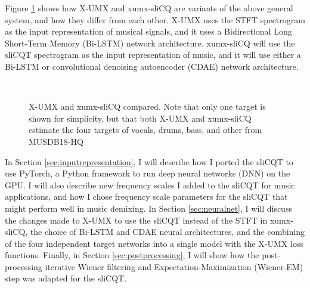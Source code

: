 \documentclass[report.tex]{subfiles}
\begin{document}
Figure \ref{fig:umxandxumxslicq} shows how X-UMX and xumx-sliCQ are variants of the above general system, and how they differ from each other. X-UMX uses the STFT spectrogram as the input representation of musical signals, and it uses a Bidirectional Long Short-Term Memory (Bi-LSTM) network architecture. xumx-sliCQ will use the sliCQT spectrogram as the input representation of music, and it will use either a Bi-LSTM or convolutional denoising autoencoder (CDAE) network architecture.

\begin{figure}[ht]
	\centering
	\\
	\caption{X-UMX and xumx-sliCQ compared. Note that only one target is shown for simplicity, but that both X-UMX and xumx-sliCQ estimate the four targets of vocals, drums, bass, and other from MUSDB18-HQ}
	\label{fig:umxandxumxslicq}
\end{figure}

In Section \ref{sec:inputrepresentation}, I will describe how I ported the sliCQT to use PyTorch, a Python framework to run deep neural networks (DNN) on the GPU. I will also describe new frequency scales I added to the sliCQT for music applications, and how I chose frequency scale parameters for the sliCQT that might perform well in music demixing. In Section \ref{sec:neuralnet}, I will discuss the changes made to X-UMX to use the sliCQT instead of the STFT in xumx-sliCQ, the choice of Bi-LSTM and CDAE neural architectures, and the combining of the four independent target networks into a single model with the X-UMX loss functions. Finally, in Section \ref{sec:postprocessing}, I will show how the post-processing iterative Wiener filtering and Expectation-Maximization (Wiener-EM) step was adapted for the sliCQT.
\end{document}
